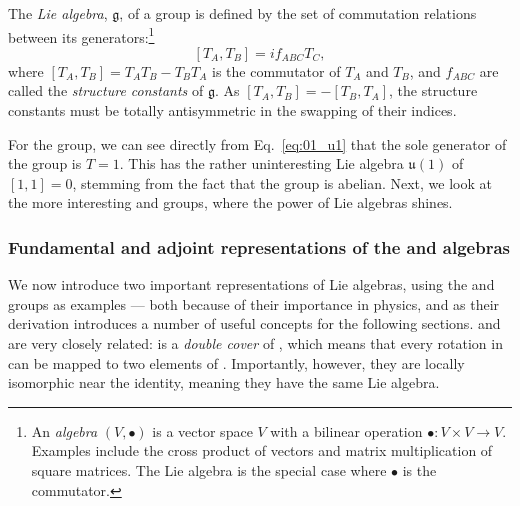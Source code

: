 \begin{definition}
\label{def:01_lie_algebra}
The \textit{Lie algebra}, $\mathfrak{g}$, of a group is defined by the set of commutation relations between its generators:\footnote{An \textit{algebra} $(V, \bullet)$ is a vector space $V$ with a bilinear operation $\bullet: V \times V \rightarrow V$.
Examples include the cross product of vectors and matrix multiplication of square matrices.
The Lie algebra is the special case where $\bullet$ is the commutator.}
\begin{equation}
	\label{eq:01_lie_algebra}
	[T_A, T_B] = i f_{ABC} T_C,
\end{equation}
where $[T_A, T_B] = T_A T_B - T_B T_A$ is the commutator of $T_A$ and $T_B$, and $f_{ABC}$ are called the \textit{structure constants} of $\mathfrak{g}$.
As $[T_A, T_B] = -[T_B, T_A]$, the structure constants must be totally antisymmetric in the swapping of their indices.
\end{definition}

\begin{example}
\label{example:01_u1_lie}
For the \UU[1] group,  we can see directly from Eq.~\ref{eq:01_u1} that the sole generator of the group is $T = 1$.
This has the rather uninteresting Lie algebra $\mathfrak{u}(1)$ of $[1, 1] = 0$, stemming from the fact that the group is abelian.
Next, we look at the more interesting \SO[3] and \SU[2] groups, where the power of Lie algebras shines.
\end{example}


\label{sec:01_symmetries_so3}

\subsubsection{Fundamental and adjoint representations of the \so[3] and \su[2] algebras}

We now introduce two important representations of Lie algebras, using the \SO[3] and \SU[2] groups as examples --- both because of their importance in physics, and as their derivation introduces a number of useful concepts for the following sections.
\SO[3] and \SU[2] are very closely related: \SU[2] is a \textit{double cover} of \SO[3], which means that every rotation in \SO[3] can be mapped to two elements of \SU[2].
Importantly, however, they are locally isomorphic near the identity, meaning they have the same Lie algebra.

